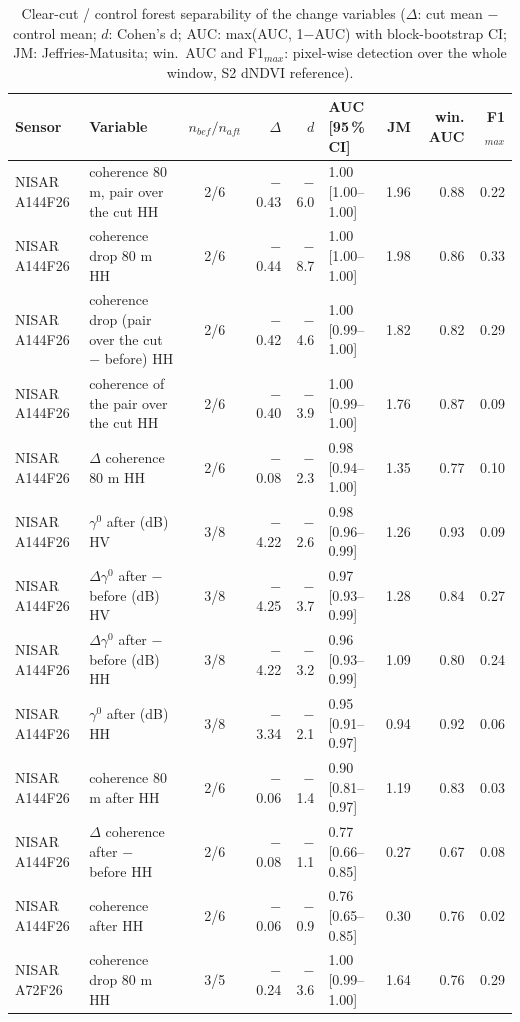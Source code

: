 \begin{table}[htbp]
\centering
\scriptsize
\caption{Clear-cut / control forest separability of the change variables ($\Delta$: cut mean $-$ control mean; $d$: Cohen's d; AUC: max(AUC, 1$-$AUC) with block-bootstrap CI; JM: Jeffries-Matusita; win.\ AUC and F1$_{max}$: pixel-wise detection over the whole window, S2 dNDVI reference).}
\label{tab:separability}
\begin{tabular}{llcrrlrrr}
\toprule
Sensor & Variable & $n_{bef}/n_{aft}$ & $\Delta$ & $d$ & AUC [95\,\% CI] & JM & win. AUC & F1$_{max}$ \\
\midrule
NISAR A144F26 & coherence 80 m, pair over the cut HH & 2/6 & $-$0.43 & $-$6.0 & 1.00 [1.00--1.00] & 1.96 & 0.88 & 0.22 \\
NISAR A144F26 & coherence drop 80 m HH & 2/6 & $-$0.44 & $-$8.7 & 1.00 [1.00--1.00] & 1.98 & 0.86 & 0.33 \\
NISAR A144F26 & coherence drop (pair over the cut $-$ before) HH & 2/6 & $-$0.42 & $-$4.6 & 1.00 [0.99--1.00] & 1.82 & 0.82 & 0.29 \\
NISAR A144F26 & coherence of the pair over the cut HH & 2/6 & $-$0.40 & $-$3.9 & 1.00 [0.99--1.00] & 1.76 & 0.87 & 0.09 \\
NISAR A144F26 & $\Delta$ coherence 80 m HH & 2/6 & $-$0.08 & $-$2.3 & 0.98 [0.94--1.00] & 1.35 & 0.77 & 0.10 \\
NISAR A144F26 & $\gamma^0$ after (dB) HV & 3/8 & $-$4.22 & $-$2.6 & 0.98 [0.96--0.99] & 1.26 & 0.93 & 0.09 \\
NISAR A144F26 & $\Delta\gamma^0$ after $-$ before (dB) HV & 3/8 & $-$4.25 & $-$3.7 & 0.97 [0.93--0.99] & 1.28 & 0.84 & 0.27 \\
NISAR A144F26 & $\Delta\gamma^0$ after $-$ before (dB) HH & 3/8 & $-$4.22 & $-$3.2 & 0.96 [0.93--0.99] & 1.09 & 0.80 & 0.24 \\
NISAR A144F26 & $\gamma^0$ after (dB) HH & 3/8 & $-$3.34 & $-$2.1 & 0.95 [0.91--0.97] & 0.94 & 0.92 & 0.06 \\
NISAR A144F26 & coherence 80 m after HH & 2/6 & $-$0.06 & $-$1.4 & 0.90 [0.81--0.97] & 1.19 & 0.83 & 0.03 \\
NISAR A144F26 & $\Delta$ coherence after $-$ before HH & 2/6 & $-$0.08 & $-$1.1 & 0.77 [0.66--0.85] & 0.27 & 0.67 & 0.08 \\
NISAR A144F26 & coherence after HH & 2/6 & $-$0.06 & $-$0.9 & 0.76 [0.65--0.85] & 0.30 & 0.76 & 0.02 \\
\addlinespace
NISAR A72F26 & coherence drop 80 m HH & 3/5 & $-$0.24 & $-$3.6 & 1.00 [0.99--1.00] & 1.64 & 0.76 & 0.29 \\

\end{tabular}
\end{table}
